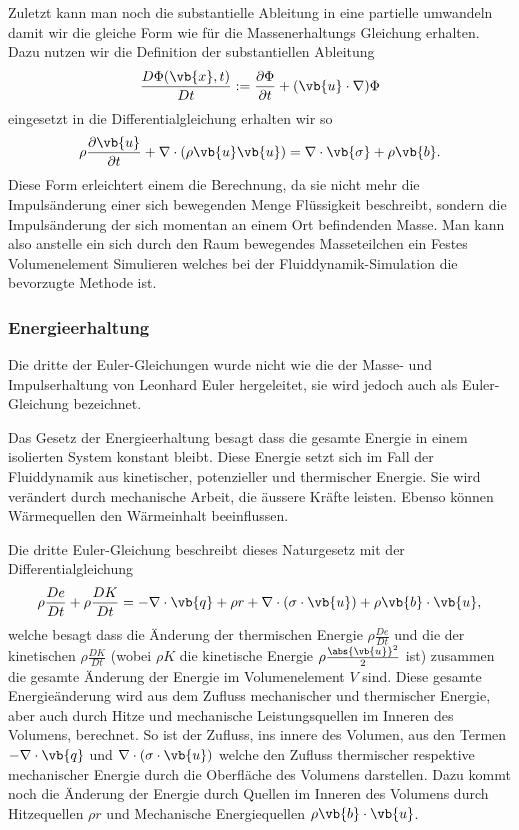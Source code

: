 Zuletzt kann man noch die substantielle Ableitung in eine partielle umwandeln damit wir die gleiche Form wie für die Massenerhaltungs Gleichung erhalten.
Dazu nutzen wir die Definition der substantiellen Ableitung
\[
\frac{D\Phi(\vb{x},t)}{Dt}
:=
\frac{\partial \Phi}{\partial t}+(\vb{u}\cdot \nabla)\Phi
\] 
eingesetzt in die Differentialgleichung erhalten wir so 
\begin{equation}
\label{openfoam:euler2}
\rho\frac{\partial\vb{u}}{\partial t} + \nabla \cdot(\rho\vb{u}\vb{u})
= 
\nabla \cdot \vb{\sigma} +\rho \vb{b}.
\end{equation}
Diese Form erleichtert einem die Berechnung, da sie nicht mehr die Impulsänderung einer sich bewegenden Menge Flüssigkeit beschreibt, sondern die Impulsänderung der sich momentan an einem Ort befindenden Masse. Man kann also anstelle ein sich durch den Raum bewegendes Masseteilchen ein Festes Volumenelement Simulieren welches bei der Fluiddynamik-Simulation die bevorzugte Methode ist.

\subsubsection{Energieerhaltung}
Die dritte der Euler-Gleichungen wurde nicht wie die der Masse- und Impulserhaltung von Leonhard Euler hergeleitet, sie wird jedoch auch als  Euler-Gleichung bezeichnet.

Das Gesetz der Energieerhaltung besagt dass die gesamte Energie in einem isolierten System konstant bleibt.
Diese Energie setzt sich im Fall der Fluiddynamik aus kinetischer, potenzieller und thermischer Energie.
Sie wird verändert durch mechanische Arbeit, die äussere Kräfte leisten. Ebenso können Wärmequellen den Wärmeinhalt beeinflussen.

Die dritte Euler-Gleichung beschreibt dieses Naturgesetz mit der Differentialgleichung 
\begin{equation}
\label{openfoam:euler3}
\rho \frac{De}{Dt}+  \rho \frac{DK}{Dt}
=
- \nabla \cdot \vb{q} + \rho r + \nabla \cdot (\sigma \cdot \vb{u}) + \rho \vb{b} \cdot \vb{u} 
,\end{equation}
welche besagt dass die Änderung der thermischen Energie $\rho \frac{De}{Dt}$ und die der kinetischen $\rho \frac{DK}{Dt}$ (wobei $\rho K$ die kinetische Energie $\rho \frac{\abs{\vb{u}}^{2}}{2}$ ist) zusammen die gesamte Änderung der Energie im Volumenelement $V$ sind.
Diese gesamte Energieänderung wird aus dem Zufluss mechanischer und thermischer Energie, aber auch durch Hitze und mechanische Leistungsquellen im Inneren des Volumens, berechnet.
So ist der Zufluss, ins innere des Volumen, aus den Termen $- \nabla \cdot \vb{q}$ und $\nabla \cdot (\sigma \cdot \vb{u})$ welche den Zufluss thermischer respektive mechanischer Energie durch die Oberfläche des Volumens darstellen.
Dazu kommt noch die Änderung der Energie durch Quellen im Inneren des Volumens durch Hitzequellen $\rho r$ und Mechanische Energiequellen $\rho \vb{b} \cdot \vb{u}$.

